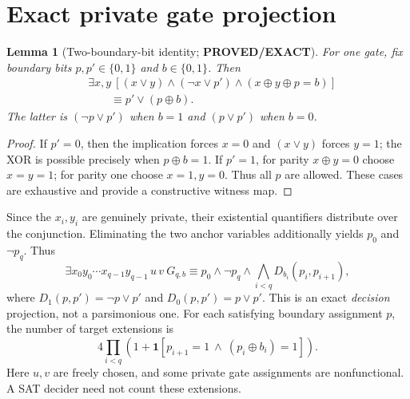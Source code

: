 \documentclass[11pt]{article}
\newtheorem{lemma}{Lemma}
\newcommand{\PROVED}{\textbf{PROVED/EXACT}}
\begin{document}
\section{Exact private gate projection}
\begin{lemma}[Two-boundary-bit identity; \PROVED]\label{lem:project}
For one gate, fix boundary bits $p,p'\in\{0,1\}$ and $b\in\{0,1\}$.
Then
\[
\begin{split}
&\exists x,y\
[(x\vee y)\land(\neg x\vee p')\land
 (x\oplus y\oplus p=b)]\\
&\qquad\equiv
p'\lor(p\oplus b).
\end{split}
\tag{5}
\]
The latter is $(\neg p\vee p')$ when $b=1$
and $(p\vee p')$ when $b=0$.
\end{lemma}
\begin{proof}
If $p'=0$, then the implication forces $x=0$ and
$(x\vee y)$ forces $y=1$; the XOR is possible precisely
when $p\oplus b=1$. If $p'=1$, for parity
$x\oplus y=0$ choose $x=y=1$; for parity one
choose $x=1,y=0$. Thus all $p$ are allowed.
These cases are exhaustive and provide a constructive witness map.
\end{proof}

Since the $x_i,y_i$ are genuinely private, their existential
quantifiers distribute over the conjunction. Eliminating the two
anchor variables additionally yields $p_0$ and $\neg p_q$.
Thus
\[
\exists x_0y_0\cdots x_{q-1}y_{q-1}\,u\,v\
G_{q,b}
\equiv
p_0\land\neg p_q\land
\bigwedge_{i<q}D_{b_i}(p_i,p_{i+1}),
\tag{6}
\]
where
$D_1(p,p')=\neg p\vee p'$ and $D_0(p,p')=p\vee p'$.
This is an exact \emph{decision} projection, not a parsimonious
one. For each satisfying boundary assignment $p$, the number of
target extensions is
\[
4\prod_{i<q}
\left(1+\mathbf1[
p_{i+1}=1\ \land\ (p_i\oplus b_i)=1]\right).
\tag{7}
\]
Here $u,v$ are freely chosen, and some private gate assignments
are nonfunctional. A SAT decider need not count these extensions.
\end{document}
